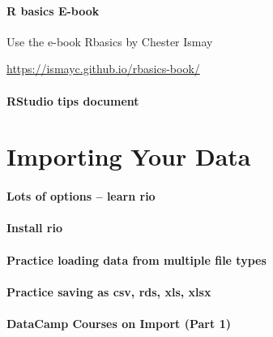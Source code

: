 \documentclass[]{book}
\theoremstyle{definition}
\theoremstyle{definition}
\theoremstyle{definition}
\theoremstyle{remark}
\begin{document}
\hypertarget{r-basics-e-book}{%
\subsubsection{R basics E-book}\label{r-basics-e-book}}

 Use the e-book Rbasics by Chester Ismay

\url{https://ismayc.github.io/rbasics-book/}

\hypertarget{rstudio-tips-document}{%
\subsubsection{RStudio tips document}\label{rstudio-tips-document}}

\hypertarget{importing-your-data}{%
\chapter{Importing Your Data}\label{importing-your-data}}

\hypertarget{lots-of-options-learn-rio}{%
\subsubsection{Lots of options -- learn
rio}\label{lots-of-options-learn-rio}}

\hypertarget{install-rio}{%
\subsubsection{Install rio}\label{install-rio}}

\hypertarget{practice-loading-data-from-multiple-file-types}{%
\subsubsection{Practice loading data from multiple file
types}\label{practice-loading-data-from-multiple-file-types}}

\hypertarget{practice-saving-as-csv-rds-xls-xlsx}{%
\subsubsection{Practice saving as csv, rds, xls,
xlsx}\label{practice-saving-as-csv-rds-xls-xlsx}}

\hypertarget{datacamp-courses-on-import-part-1}{%
\subsubsection{DataCamp Courses on Import (Part
1)}\label{datacamp-courses-on-import-part-1}}
\end{document}
